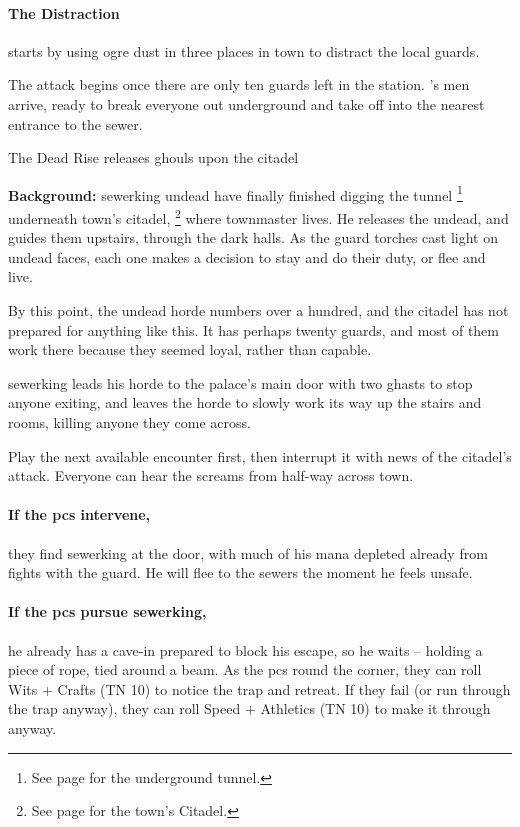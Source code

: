\paragraph{The Distraction} starts by using ogre dust in three places in town to distract the local guards.

The attack begins once there are only ten guards left in the station.
's men arrive, ready to break everyone out underground and take off into the nearest entrance to the sewer.

{The Dead Rise}%
{ releases ghouls upon the citadel}%

\textbf{Background:}
\Gls{sewerking} undead have finally finished digging the tunnel
\footnote{See page \pageref{citadelTunnel} for the underground tunnel.}
underneath \gls{town}'s citadel,
\footnote{See page \pageref{citadel} for the town's Citadel.}
where \gls{townmaster} lives.
He releases the undead, and guides them upstairs, through the dark halls.
As the \gls{guard} torches cast light on undead faces, each one makes a decision to stay and do their duty, or flee and live.

By this point, the undead horde numbers over a hundred, and the citadel has not prepared for anything like this.
It has perhaps twenty guards, and most of them work there because they seemed loyal, rather than capable.

\Gls{sewerking} leads his horde to the palace's main door with two ghasts to stop anyone exiting, and leaves the horde to slowly work its way up the stairs and rooms, killing anyone they come across.

Play the next available encounter first, then interrupt it with news of the citadel's attack.
Everyone can hear the screams from half-way across \gls{town}.

\paragraph{If the \glspl{pc} intervene,}
they find \gls{sewerking} at the door, with much of his mana depleted already from fights with the guard.
He will flee to the sewers the moment he feels unsafe.

\ghast

\ghast

\sewerking


\paragraph{If the \glspl{pc} pursue \gls{sewerking},}
he already has a cave-in prepared to block his escape, so he waits -- holding a piece of rope, tied around a beam.
As the \glspl{pc} round the corner, they can roll Wits + Crafts (TN 10) to notice the trap and retreat.
If they fail (or run through the trap anyway), they can roll Speed + Athletics (TN 10) to make it through anyway.

